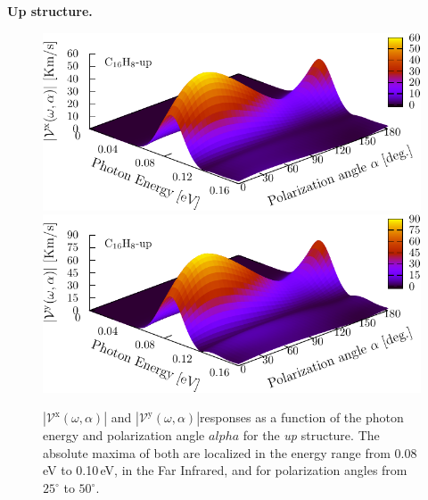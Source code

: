 \documentclass[prb,11pt,tightenlines,twocolumn,aps]{revtex4-1}
\begin{document}
\textbf{Up structure.}
\begin{figure}[t]
    \centering
    \includegraphics[width=\linewidth]{upplots/up-3d-vxb-1}
    \label{fig:up-3d-vvx-1}
    \\
    \includegraphics[width=\linewidth]{upplots/up-3d-vyb-1}
    \label{fig:up-3d-vvy-1}
    
    \caption{ $|\mathcal{V}^{\mathrm{x}}(\omega,\alpha)|$ and
    $|\mathcal{V}^{\mathrm{y}}(\omega,\alpha)|$responses as a function of the
    photon energy and polarization angle $alpha$ for the \emph{up} structure.
    The absolute maxima of both are localized in the energy range from 0.08\,eV
    to 0.10\,eV, in the Far  Infrared, and for polarization angles from
    $25^{\circ}$ to $50^{\circ}$.}
    \label{fig:up-3d-vva-1}
\end{figure}
\end{document}
